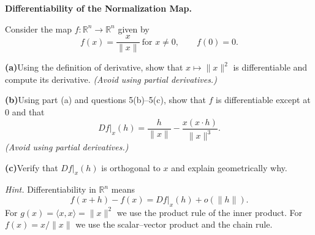 \begin{problem}[CP-II-0048]
\label{prob:cp-ii-0048}
\textbf{Differentiability of the Normalization Map.}

\hspace*{1.5em}Consider the map $f:\mathbb{R}^n\to\mathbb{R}^n$ given by
	\[
	f(x)=\frac{x}{\|x\|}\ \text{for }x\ne0,\qquad f(0)=0.
	\]

		\par\smallskip\noindent\textbf{(a)}\quad Using the definition of derivative, show that $x\mapsto\|x\|^2$ is differentiable and compute its derivative.
		\textit{(Avoid using partial derivatives.)}
		\par\smallskip\noindent\textbf{(b)}\quad Using part (a) and questions 5(b)--5(c), show that $f$ is differentiable except at $0$ and that
		\[
		Df|_x(h)=\frac{h}{\|x\|}-\frac{x(x\!\cdot\!h)}{\|x\|^3}.
		\]
		\textit{(Avoid using partial derivatives.)}
		\par\smallskip\noindent\textbf{(c)}\quad Verify that $Df|_x(h)$ is orthogonal to $x$ and explain geometrically why.


	\emph{Hint.} Differentiability in $\mathbb{R}^n$ means
	\[
	f(x+h)-f(x)=Df|_x(h)+o(\|h\|).
	\]
	For $g(x)=\langle x,x\rangle=\|x\|^2$ we use the product rule of the inner product.
	For $f(x)=x/\|x\|$ we use the scalar--vector product and the chain rule.

\end{problem}

